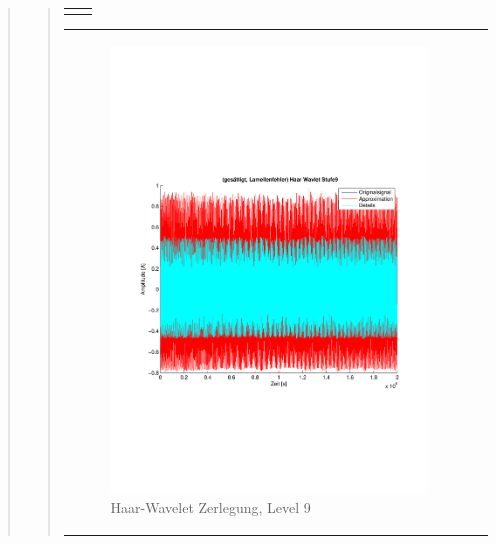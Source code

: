 \begin{quote}
\begin{quote}
\begin{center}
\begin{tabular}{ll}
\begin{minipage}{0.6\textwidth}
                    \end{minipage}
    
                \end{tabular}
                \end{center}
    
                
                
        \begin{center}
                \begin{tabular}{ll}
    
                \hspace{-8em}
                    \begin{minipage}{0.6\textwidth}
    
                        \begin{figure}[H]
                            \label{fig:}
                            \includegraphics[scale=0.4, trim = 2cm 6cm 1cm
                            7.5cm,
                            clip]{./Bilder/Termin8/lamellenfehler_gesaettigt_Haar_Wavlet_lvl_9}
                            \caption{Haar-Wavelet Zerlegung, Level 9}
                        \end{figure}
    

\end{minipage}
\end{tabular}
\end{center}
\end{quote}
\end{quote}
